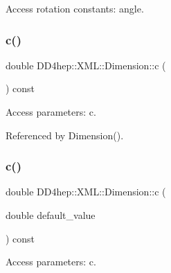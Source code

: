 Access rotation constants\+: angle. 

\hypertarget{struct_d_d4hep_1_1_x_m_l_1_1_dimension_aaa3e181c05ec07616bf745173004d73f}{}\label{struct_d_d4hep_1_1_x_m_l_1_1_dimension_aaa3e181c05ec07616bf745173004d73f} 
\subsubsection{\texorpdfstring{c()}{c()}\hspace{0.1cm}{\footnotesize\ttfamily [1/2]}}
{\footnotesize\ttfamily double D\+D4hep\+::\+X\+M\+L\+::\+Dimension\+::c (\begin{DoxyParamCaption}{ }\end{DoxyParamCaption}) const}



Access parameters\+: c. 



Referenced by Dimension().

\hypertarget{struct_d_d4hep_1_1_x_m_l_1_1_dimension_a5ff71d66e676f0f3a40113b3b177f3bc}{}\label{struct_d_d4hep_1_1_x_m_l_1_1_dimension_a5ff71d66e676f0f3a40113b3b177f3bc} 
\subsubsection{\texorpdfstring{c()}{c()}\hspace{0.1cm}{\footnotesize\ttfamily [2/2]}}
{\footnotesize\ttfamily double D\+D4hep\+::\+X\+M\+L\+::\+Dimension\+::c (\begin{DoxyParamCaption}\item[{double}]{default\+\_\+value }\end{DoxyParamCaption}) const}



Access parameters\+: c. 

\hypertarget{struct_d_d4hep_1_1_x_m_l_1_1_dimension_ace7fb136968f4abdde87b86c8f8da72b}{}\label{struct_d_d4hep_1_1_x_m_l_1_1_dimension_ace7fb136968f4abdde87b86c8f8da72b} 
